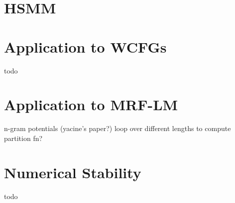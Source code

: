 \documentclass{article}
\begin{document}
\section{HSMM}

\section{Application to WCFGs}
todo

\section{Application to MRF-LM}
n-gram potentials (yacine's paper?)
loop over different lengths to compute partition fn?

\section{Numerical Stability}
todo



\end{document}
